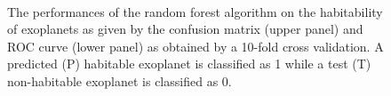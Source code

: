 \documentclass[
12pt, %
a4paper, %
oneside, %
headinclude,footinclude, %
BCOR5mm, %
]{scrartcl}
\begin{document}
\begin{figure}[h]
  \centering
{}\\
\caption{The performances of the random forest algorithm on the habitability of exoplanets as given by the confusion matrix (upper panel) and ROC curve (lower panel) as obtained by a 10-fold cross validation. A predicted (P) habitable exoplanet is classified as 1 while a test (T) non-habitable exoplanet is classified as 0.}
\label{Random_forest_tree_results}
\end{figure}
\end{document}
